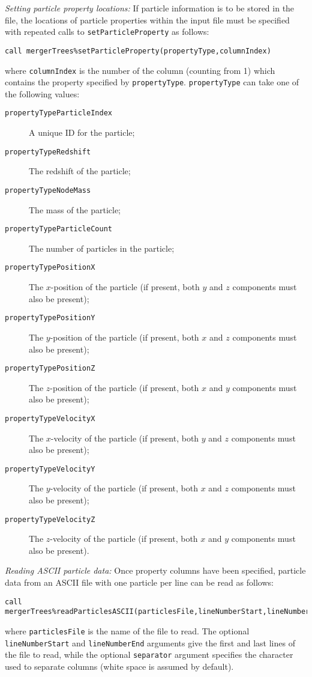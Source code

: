 \noindent \emph{Setting particle property locations:} If particle information is to be stored in the file, the locations of particle properties within the input file must be specified with repeated calls to {\tt setParticleProperty} as follows:
\begin{verbatim}
call mergerTrees%setParticleProperty(propertyType,columnIndex)
\end{verbatim}
where {\tt columnIndex} is the number of the column (counting from 1) which contains the property specified by {\tt propertyType}. {\tt propertyType} can take one of the following values:
\begin{description}
 \item [{\tt propertyTypeParticleIndex}] A unique ID for the particle;
 \item [{\tt propertyTypeRedshift}] The redshift of the particle;
 \item [{\tt propertyTypeNodeMass}] The mass of the particle;
 \item [{\tt propertyTypeParticleCount}] The number of particles in the particle;
 \item [{\tt propertyTypePositionX}] The $x$-position of the particle (if present, both $y$ and $z$ components must also be present);
 \item [{\tt propertyTypePositionY}] The $y$-position of the particle (if present, both $x$ and $z$ components must also be present);
 \item [{\tt propertyTypePositionZ}] The $z$-position of the particle (if present, both $x$ and $y$ components must also be present);
 \item [{\tt propertyTypeVelocityX}] The $x$-velocity of the particle (if present, both $y$ and $z$ components must also be present);
 \item [{\tt propertyTypeVelocityY}] The $y$-velocity of the particle (if present, both $x$ and $z$ components must also be present);
 \item [{\tt propertyTypeVelocityZ}] The $z$-velocity of the particle (if present, both $x$ and $y$ components must also be present).
\end{description}

\noindent \emph{Reading ASCII particle data:} Once property columns have been specified, particle data from an ASCII file with one particle per line can be read as follows:
\begin{verbatim}
call mergerTrees%readParticlesASCII(particlesFile,lineNumberStart,lineNumberStop,separator=",")
\end{verbatim}
where {\tt particlesFile} is the name of the file to read. The optional {\tt lineNumberStart} and {\tt lineNumberEnd} arguments give the first and last lines of the file to read, while the optional {\tt separator} argument specifies the character used to separate columns (white space is assumed by default).\\

